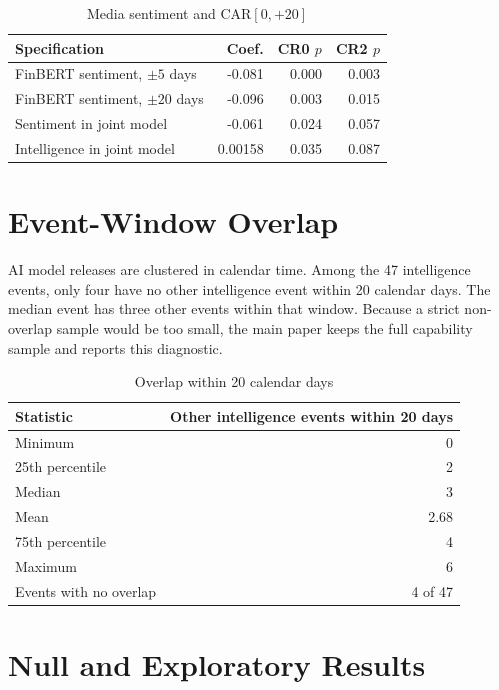 \documentclass[12pt]{article}
\begin{document}
\begin{table}[htbp]
\centering
\caption{Media sentiment and CAR$[0,{+}20]$}
\label{tab:a_sentiment}
\begin{tabular}{lrrr}
\toprule
Specification & Coef. & CR0 $p$ & CR2 $p$ \\
\midrule
FinBERT sentiment, $\pm 5$ days & -0.081 & 0.000 & 0.003 \\
FinBERT sentiment, $\pm 20$ days & -0.096 & 0.003 & 0.015 \\
Sentiment in joint model & -0.061 & 0.024 & 0.057 \\
Intelligence in joint model & 0.00158 & 0.035 & 0.087 \\
\bottomrule
\end{tabular}
\end{table}

\section{Event-Window Overlap}
\label{app:overlap}

AI model releases are clustered in calendar time. Among the 47 intelligence
events, only four have no other intelligence event within 20 calendar days.
The median event has three other events within that window. Because a strict
non-overlap sample would be too small, the main paper keeps the full capability
sample and reports this diagnostic.

\begin{table}[htbp]
\centering
\caption{Overlap within 20 calendar days}
\label{tab:a_overlap}
\begin{tabular}{lr}
\toprule
Statistic & Other intelligence events within 20 days \\
\midrule
Minimum & 0 \\
25th percentile & 2 \\
Median & 3 \\
Mean & 2.68 \\
75th percentile & 4 \\
Maximum & 6 \\
Events with no overlap & 4 of 47 \\
\bottomrule
\end{tabular}
\end{table}

\section{Null and Exploratory Results}
\label{app:null}
\end{document}
